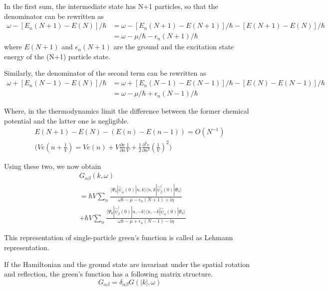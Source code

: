﻿\documentclass[twoside]{book}
\numberwithin{equation}{section}
\begin{document}
In the first sum, the intermediate state has N+1 particles, so that the denominator can be rewritten as
\begin{align}
\omega-[E_n(N+1)-E(N)]/\hbar &= \omega-[E_n(N+1)-E(N+1)]/\hbar-[E(N+1)-E(N)]/\hbar \nonumber \\
&=\omega-\mu/\hbar-\epsilon_n(N+1)/\hbar \nonumber
\end{align}
where $E(N+1)$ and $\epsilon_n(N+1)$ are the ground and the excitation state energy of the (N+1) particle state.

Similarly, the denominator of the second term can be rewritten as 
\begin{align}
\omega+[E_n(N-1)-E(N)]/\hbar &= \omega+[E_n(N-1)-E(N-1)]/\hbar-[E(N)-E(N-1)]/\hbar \nonumber \\
&=\omega-\mu/\hbar+\epsilon_n(N-1)/\hbar \nonumber
\end{align}

Where, in the thermodynamics limit the difference between the former chemical potential and the latter one is negligible.
\begin{align}
E(N+1)-E(N)-(E(n)-E(n-1))=O(N^{-1}) \nonumber \\
\bigg ( Ve(n+\frac{1}{V}) = Ve(n)+ V\frac{\partial e}{\partial n}\frac{1}{V} + \frac{1}{2} \frac{\partial^2 e}{\partial n^2} (\frac{1}{V})^2 \bigg) \nonumber
\end{align}

Using these two, we now obtain 
\begin{align}\label{2.3.12}
& G_{\alpha\beta}(k,\omega) \nonumber \\
&=\hbar V\sum_n \frac{\langle\Psi_0|\hat \psi_{\alpha}(0)|n,k\rangle\langle n,k|\hat \psi^{
\dagger}_{\beta} (0)|\Psi_0\rangle}{\omega\hbar-\mu-\epsilon_n(N+1)+\mathrm{i}\eta}  \nonumber \\
&+\hbar V\sum_n \frac{\langle\Psi_0|\hat \psi^{
\dagger}_{\beta} (0)|n,-k\rangle\langle n,-k|\hat \psi_{\alpha}(0)|\Psi_0\rangle}{\omega\hbar-\mu+\epsilon_n(N-1)-\mathrm{i}\eta} 
\end{align}

This representation of single-particle green's function is called as Lehmann representation.

If the Hamiltonian and the ground state are invariant under the spatial rotation and reflection, the green's function has a following matrix structure.
\begin{equation}
G_{\alpha\beta}=\delta_{\alpha\beta}G(|k|,\omega) \nonumber
\end{equation}
\end{document}
